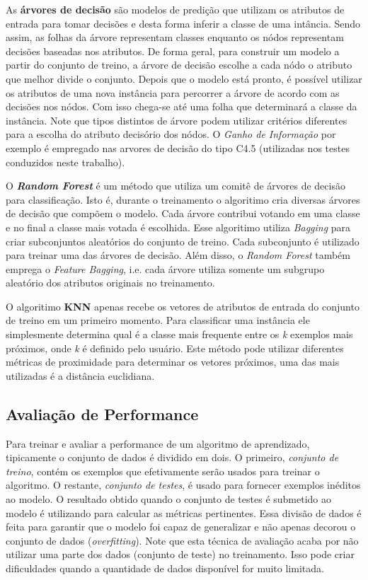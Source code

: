 As \textbf{árvores de decisão} são modelos de predição que utilizam os atributos de entrada para tomar decisões e desta forma inferir a classe de uma intância.
Sendo assim, as folhas da árvore representam classes enquanto os nódos representam decisões baseadas nos atributos.
De forma geral, para construir um modelo a partir do conjunto de treino, a árvore de decisão escolhe a cada nódo o atributo que melhor divide o conjunto.
Depois que o modelo está pronto, é possível utilizar os atributos de uma nova instância para percorrer a árvore de acordo com as decisões nos nódos.
Com isso chega-se até uma folha que determinará a classe da instância.
Note que tipos distintos de árvore podem utilizar critérios diferentes para a escolha do atributo decisório dos nódos.
O \textit{ Ganho de Informação} por exemplo é empregado nas arvores de decisão do tipo C4.5 (utilizadas nos testes conduzidos neste trabalho).

O \textbf{\textit{Random Forest}} é um método que utiliza um comitê de árvores de decisão para classificação.
Isto é, durante o treinamento o algoritimo cria diversas árvores de decisão que compõem o modelo.
Cada árvore contribui votando em uma classe e no final a classe mais votada é escolhida.
Esse algoritimo utiliza \textit{Bagging} para criar subconjuntos aleatórios do conjunto de treino.
Cada subconjunto é utilizado para treinar uma das árvores de decisão.
Além disso, o \textit{Random Forest} também emprega o \textit{Feature Bagging}, i.e. cada árvore utiliza somente um subgrupo aleatório dos atributos originais no treinamento.

O algoritimo \textbf{KNN} apenas recebe os vetores de atributos de entrada do conjunto de treino em um primeiro momento.
Para classificar uma instância ele simplesmente determina qual é a classe mais frequente entre os \textit{k} exemplos mais próximos, onde \textit{k} é definido pelo usuário.
Este método pode utilizar diferentes métricas de proximidade para determinar os vetores próximos, uma das mais utilizadas é a distância euclidiana.

\subsection{Avaliação de Performance}

Para treinar e avaliar a performance de um algoritmo de aprendizado, tipicamente o conjunto de dados é dividido em dois.
O primeiro, \textit{conjunto de treino}, contém os exemplos que efetivamente serão usados para treinar o algoritmo.
O restante, \textit{conjunto de testes}, é usado para fornecer exemplos inéditos ao modelo.
O resultado obtido quando o conjunto de testes é submetido ao modelo é utilizando para calcular as métricas pertinentes.
Essa divisão de dados é feita para garantir que o modelo foi capaz de generalizar e não apenas decorou o conjunto de dados (\textit{overfitting}).
Note que esta técnica de avaliação acaba por não utilizar uma parte dos dados (conjunto de teste) no treinamento.
Isso pode criar dificuldades quando a quantidade de dados disponível for muito limitada.

